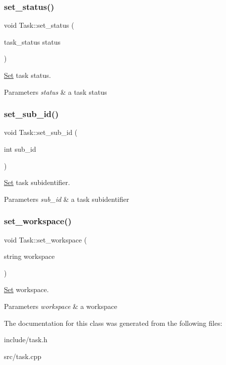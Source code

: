 \subsubsection{\texorpdfstring{set\+\_\+status()}{set\_status()}}
{\footnotesize\ttfamily void Task\+::set\+\_\+status (\begin{DoxyParamCaption}\item[{task\+\_\+status}]{status }\end{DoxyParamCaption})}

\hyperlink{classSet}{Set} task status. 
\begin{DoxyParams}{Parameters}
{\em status} & a task status \\
\hline
\end{DoxyParams}
\mbox{\label{classTask_a943ea609e9e335120a40ed8b3d2adad8}} 
\subsubsection{\texorpdfstring{set\+\_\+sub\+\_\+id()}{set\_sub\_id()}}
{\footnotesize\ttfamily void Task\+::set\+\_\+sub\+\_\+id (\begin{DoxyParamCaption}\item[{int}]{sub\+\_\+id }\end{DoxyParamCaption})}

\hyperlink{classSet}{Set} task subidentifier. 
\begin{DoxyParams}{Parameters}
{\em sub\+\_\+id} & a task subidentifier \\
\hline
\end{DoxyParams}
\mbox{\label{classTask_aba1111f932df1f306dc581b51350fcac}} 
\subsubsection{\texorpdfstring{set\+\_\+workspace()}{set\_workspace()}}
{\footnotesize\ttfamily void Task\+::set\+\_\+workspace (\begin{DoxyParamCaption}\item[{string}]{workspace }\end{DoxyParamCaption})}

\hyperlink{classSet}{Set} workspace. 
\begin{DoxyParams}{Parameters}
{\em workspace} & a workspace \\
\hline
\end{DoxyParams}


The documentation for this class was generated from the following files\+:\begin{DoxyCompactItemize}
\item 
include/task.\+h\item 
src/task.\+cpp\end{DoxyCompactItemize}
